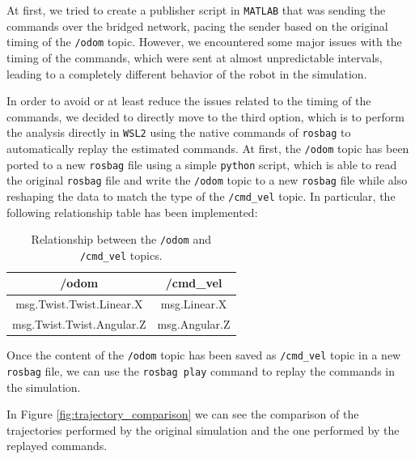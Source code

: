 At first, we tried to create a publisher script in \texttt{MATLAB} that was sending the commands over the bridged network, pacing the sender based on the original timing of the \texttt{/odom} topic.
However, we encountered some major issues with the timing of the commands, which were sent at almost unpredictable intervals, leading to a completely different behavior of the robot in the simulation.

In order to avoid or at least reduce the issues related to the timing of the commands, we decided to directly move to the third option, which is to perform the analysis directly in \texttt{WSL2} using the native commands of \texttt{rosbag} to automatically replay the estimated commands.
At first, the \texttt{/odom} topic has been ported to a new \texttt{rosbag} file using a simple \texttt{python} script, which is able to read the original \texttt{rosbag} file and write the \texttt{/odom} topic to a new \texttt{rosbag} file while also reshaping the data to match the type of the \texttt{/cmd\_vel} topic.
In particular, the following relationship table has been implemented:

\begin{table}[H]
    \centering
    \begin{tabular}{c|c}
        \textbf{/odom}            & \textbf{/cmd\_vel} \\
        \hline
        msg.Twist.Twist.Linear.X  & msg.Linear.X       \\
        msg.Twist.Twist.Angular.Z & msg.Angular.Z      \\
        \hline
    \end{tabular}
    \caption{Relationship between the \texttt{/odom} and \texttt{/cmd\_vel} topics.}
    \label{tab:rosbag_relationship}
\end{table}

Once the content of the \texttt{/odom} topic has been saved as \texttt{/cmd\_vel} topic in a new \texttt{rosbag} file, we can use the \texttt{rosbag play} command to replay the commands in the simulation.

In Figure \ref{fig:trajectory_comparison} we can see the comparison of the trajectories performed by the original simulation and the one performed by the replayed commands.

